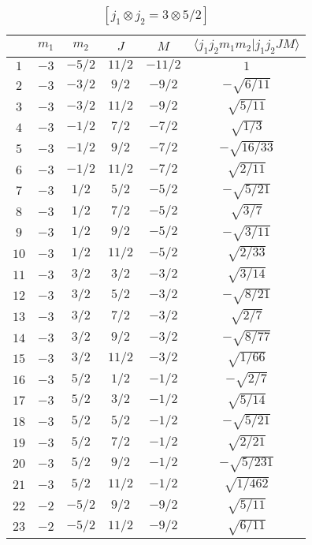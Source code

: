 \begin{table}
\tiny
\caption{$[j_1 \otimes j_2 = 3 \otimes 5/2]$}
\begin{center}
\begin{tabular}{|c|c|c|c|c|c|}
\hline 
   & $m_1$ & $m_2$ & $J$ & $M$ & $\langle j_1 j_2 m_1 m_2 | j_1 j_2 J M \rangle$ \\ 
\hline 
$1$ & $-3$ & $-5/2$ & $11/2$ & $-11/2$ & $1$ \\ 
$2$ & $-3$ & $-3/2$ & $9/2$ & $-9/2$ & $-\sqrt{6/11}$ \\ 
$3$ & $-3$ & $-3/2$ & $11/2$ & $-9/2$ & $\sqrt{5/11}$ \\ 
$4$ & $-3$ & $-1/2$ & $7/2$ & $-7/2$ & $\sqrt{1/3}$ \\ 
$5$ & $-3$ & $-1/2$ & $9/2$ & $-7/2$ & $-\sqrt{16/33}$ \\ 
$6$ & $-3$ & $-1/2$ & $11/2$ & $-7/2$ & $\sqrt{2/11}$ \\ 
$7$ & $-3$ & $1/2$ & $5/2$ & $-5/2$ & $-\sqrt{5/21}$ \\ 
$8$ & $-3$ & $1/2$ & $7/2$ & $-5/2$ & $\sqrt{3/7}$ \\ 
$9$ & $-3$ & $1/2$ & $9/2$ & $-5/2$ & $-\sqrt{3/11}$ \\ 
$10$ & $-3$ & $1/2$ & $11/2$ & $-5/2$ & $\sqrt{2/33}$ \\ 
$11$ & $-3$ & $3/2$ & $3/2$ & $-3/2$ & $\sqrt{3/14}$ \\ 
$12$ & $-3$ & $3/2$ & $5/2$ & $-3/2$ & $-\sqrt{8/21}$ \\ 
$13$ & $-3$ & $3/2$ & $7/2$ & $-3/2$ & $\sqrt{2/7}$ \\ 
$14$ & $-3$ & $3/2$ & $9/2$ & $-3/2$ & $-\sqrt{8/77}$ \\ 
$15$ & $-3$ & $3/2$ & $11/2$ & $-3/2$ & $\sqrt{1/66}$ \\ 
$16$ & $-3$ & $5/2$ & $1/2$ & $-1/2$ & $-\sqrt{2/7}$ \\ 
$17$ & $-3$ & $5/2$ & $3/2$ & $-1/2$ & $\sqrt{5/14}$ \\ 
$18$ & $-3$ & $5/2$ & $5/2$ & $-1/2$ & $-\sqrt{5/21}$ \\ 
$19$ & $-3$ & $5/2$ & $7/2$ & $-1/2$ & $\sqrt{2/21}$ \\ 
$20$ & $-3$ & $5/2$ & $9/2$ & $-1/2$ & $-\sqrt{5/231}$ \\ 
$21$ & $-3$ & $5/2$ & $11/2$ & $-1/2$ & $\sqrt{1/462}$ \\ 
$22$ & $-2$ & $-5/2$ & $9/2$ & $-9/2$ & $\sqrt{5/11}$ \\ 
$23$ & $-2$ & $-5/2$ & $11/2$ & $-9/2$ & $\sqrt{6/11}$ \\ 

\end{tabular}
\end{center}
\end{table}
